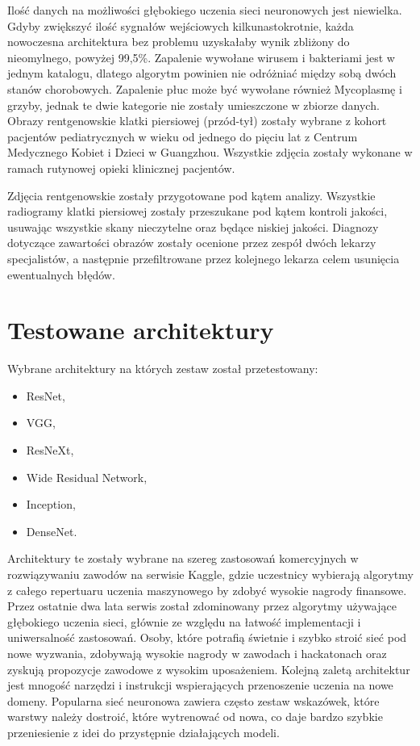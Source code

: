 \documentclass[12pt,a4paper,twoside,titlepage,openright]{book}
\begin{document}
Ilość danych na możliwości głębokiego uczenia sieci neuronowych jest niewielka. Gdyby zwiększyć ilość sygnałów wejściowych kilkunastokrotnie, każda nowoczesna architektura bez problemu uzyskałaby wynik zbliżony do nieomylnego, powyżej 99,5\%. Zapalenie wywołane wirusem i bakteriami jest w jednym katalogu, dlatego algorytm powinien nie odróżniać między sobą dwóch stanów chorobowych. Zapalenie płuc może być wywołane również Mycoplasmę i grzyby, jednak te dwie kategorie nie zostały umieszczone w zbiorze danych. Obrazy rentgenowskie klatki piersiowej (przód-tył) zostały wybrane z kohort pacjentów pediatrycznych w wieku od jednego do pięciu lat z Centrum Medycznego Kobiet i Dzieci w Guangzhou. Wszystkie zdjęcia zostały wykonane w ramach rutynowej opieki klinicznej pacjentów.

Zdjęcia rentgenowskie zostały przygotowane pod kątem analizy. Wszystkie radiogramy klatki piersiowej zostały przeszukane pod kątem kontroli jakości, usuwając wszystkie skany nieczytelne oraz będące niskiej jakości. Diagnozy dotyczące zawartości obrazów zostały ocenione przez zespół dwóch lekarzy specjalistów, a następnie przefiltrowane przez kolejnego lekarza celem usunięcia ewentualnych błędów.

\section{Testowane architektury}
Wybrane architektury na których zestaw został przetestowany:
\begin{itemize} 
\item ResNet,
\item VGG,
\item ResNeXt,
\item Wide Residual Network,
\item Inception,
\item DenseNet.
\end{itemize}

Architektury te zostały wybrane na szereg zastosowań komercyjnych w rozwiązywaniu zawodów na serwisie Kaggle, gdzie uczestnicy wybierają algorytmy z całego repertuaru uczenia maszynowego by zdobyć wysokie nagrody finansowe. Przez ostatnie dwa lata serwis został zdominowany przez algorytmy używające głębokiego uczenia sieci, głównie ze względu na łatwość implementacji i uniwersalność zastosowań. Osoby, które potrafią świetnie i szybko stroić sieć pod nowe wyzwania, zdobywają wysokie nagrody w zawodach i hackatonach oraz zyskują propozycje zawodowe z wysokim uposażeniem. Kolejną zaletą architektur jest mnogość narzędzi i instrukcji wspierających przenoszenie uczenia na nowe domeny. Popularna sieć neuronowa zawiera często zestaw wskazówek, które warstwy należy dostroić, które wytrenować od nowa, co daje bardzo szybkie przeniesienie z idei do przystępnie działających modeli.
\end{document}
